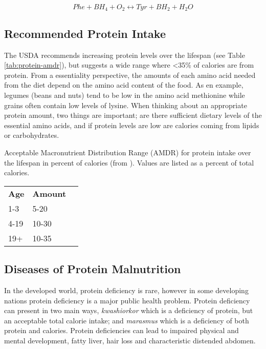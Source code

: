 \documentclass{tufte-handout}
\begin{document}
\begin{equation}
Phe + BH_4 + O_2\leftrightarrow Tyr + BH_2 + H_2O 
\end{equation}

\subsection{Recommended Protein Intake}

The USDA recommends increasing protein levels over the lifespan (see Table \ref{tab:protein-amdr}), but suggests a wide range where <35\% of calories are from protein.  From a essentiality perspective, the amounts of each amino acid needed from the diet depend on the amino acid content of the food.  As en example, legumes (beans and nuts) tend to be low in the amino acid methionine while grains often contain low levels of lysine.  When thinking about an appropriate protein amount, two things are important; are there sufficient dietary levels of the essential amino acids, and if protein levels are low are calories coming from lipids or carbohydrates.

\begin{margintable}
\centering
\caption{ Acceptable Macronutrient Distribution Range (AMDR) for protein intake over the lifespan in percent of calories (from \citep{USDA2015}).  Values are listed as a percent of total calories.}
\label{tab:protein-amdr}
\begin{tabular}{lll}
\hline
\textbf {Age} & \textbf{Amount}\\
1-3 & 5-20\\
4-19 & 10-30\\
19+ & 10-35\\
\hline

\hline
\end{tabular}
\end{margintable}

\subsection{Diseases of Protein Malnutrition}

In the developed world, protein deficiency is rare, however in some developing nations protein deficiency is a major public health problem.  Protein deficiency can present in two main ways, \emph{kwashiorkor} which is a deficiency of protein, but an acceptable total calorie intake; and \emph{marasmus} which is a deficiency of both protein and calories.  Protein deficiencies can lead to impaired physical and mental development, fatty liver, hair loss and characteristic distended abdomen.
\end{document}
